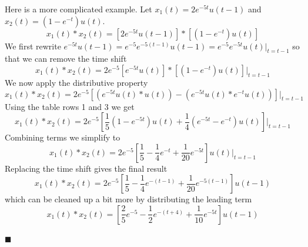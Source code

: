 \begin{example} Here is a more complicated example. Let $x_1(t) = 2e^{-5t}u(t-1)$ and $x_2(t) = \left(1-e^{-t}\right)u(t)$.
  \[
  x_1(t) * x_2(t) = \left[2e^{-5t}u(t-1)\right] * \left[\left(1-e^{-t}\right)u(t)\right]
  \]
  We first rewrite $e^{-5t}u(t-1)=e^{-5}e^{-5(t-1)}u(t-1) = e^{-5}e^{-5t}u(t)\Big|_{t=t-1}$ so that we can remove the time shift
  \[
  x_1(t) * x_2(t) = 2e^{-5}\left[e^{-5t}u(t)\right] * \left[\left(1-e^{-t}\right)u(t)\right]\Big|_{t=t-1}
  \]
  We now apply the distributive property
  \[
x_1(t) * x_2(t) = 2e^{-5}\left[\left(e^{-5t}u(t) * u(t)\right) - \left(e^{-5t}u(t)* e^{-t}u(t)\right)\right]\Big|_{t=t-1}
  \]
  Using the table rows 1 and 3 we get
  \[
  x_1(t) * x_2(t) = 2e^{-5}\left[\frac{1}{5}\left(1-e^{-5t}\right)u(t) + \frac{1}{4}\left(e^{-5t} - e^{-t}\right)u(t)\right]\Big|_{t=t-1}
  \]
  Combining terms we simplify to
  \[
x_1(t) * x_2(t) = 2e^{-5}\left[\frac{1}{5} - \frac{1}{4}e^{-t} + \frac{1}{20}e^{-5t} \right]u(t)\Big|_{t=t-1}
\]
Replacing the time shift gives the final result
\[
x_1(t) * x_2(t) = 2e^{-5}\left[\frac{1}{5} - \frac{1}{4}e^{-(t-1)} + \frac{1}{20}e^{-5(t-1)} \right]u(t-1)
\]
which can be cleaned up a bit more by distributing the leading term
\[
x_1(t) * x_2(t) =\left[\frac{2}{5}e^{-5} -\frac{1}{2}e^{-(t+4)} +\frac{1}{10}e^{-5t}\right]u(t-1)
\]
  
$\blacksquare$
\end{example}

